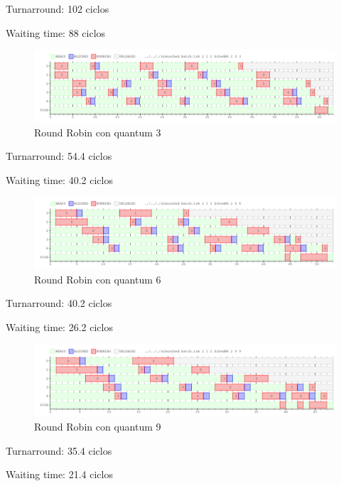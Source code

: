 Turnarround: 102 ciclos

Waiting time: 88 ciclos 

\begin{figure}[H]
\begin{center}
\includegraphics[width=1.1\textwidth]{img/core2q3.png}
     \caption{Round Robin con quantum 3}
\end{center}
\end{figure}

Turnarround: 54.4 ciclos

Waiting time: 40.2 ciclos 

\begin{figure}[H]
\begin{center}
\includegraphics[width=1.1\textwidth]{img/core2q6.png}
     \caption{Round Robin con quantum 6}
\end{center}
\end{figure}

Turnarround: 40.2 ciclos

Waiting time: 26.2 ciclos 

\begin{figure}[H]
\begin{center}
\includegraphics[width=1.1\textwidth]{img/core2q9.png}
     \caption{Round Robin con quantum 9}
\end{center}
\end{figure}

Turnarround: 35.4 ciclos

Waiting time: 21.4 ciclos 

